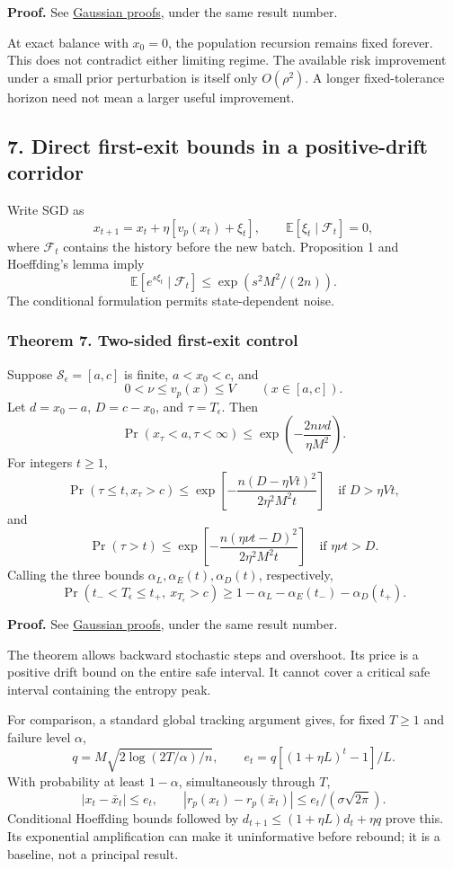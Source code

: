 \textbf{Proof.} See \href{gaussian_proofs.md}{Gaussian proofs}, under
the same result number.

At exact balance with \(x_0=0\), the population recursion remains fixed
forever. This does not contradict either limiting regime. The available
risk improvement under a small prior perturbation is itself only
\(O(\rho^2)\). A longer fixed-tolerance horizon need not mean a larger
useful improvement.

\subsection{7. Direct first-exit bounds in a positive-drift
corridor}\label{draft-direct-first-exit-bounds-in-a-positive-drift-corridor}

Write SGD as \[
x_{t+1}=x_t+\eta[v_p(x_t)+\xi_t],\qquad
\mathbb E[\xi_t\mid\mathcal F_t]=0,
\] where \(\mathcal F_t\) contains the history before the new batch.
Proposition 1 and Hoeffding's lemma imply \[
\mathbb E[e^{s\xi_t}\mid\mathcal F_t]
\le\exp(s^2M^2/(2n)).
\] The conditional formulation permits state-dependent noise.

\subsubsection{Theorem 7. Two-sided first-exit
control}\label{draft-theorem-7.-two-sided-first-exit-control}

Suppose \(\mathcal S_\epsilon=[a,c]\) is finite, \(a<x_0<c\), and \[
0<\nu\le v_p(x)\le V\qquad(x\in[a,c]).
\] Let \(d=x_0-a\), \(D=c-x_0\), and \(\tau=T_\epsilon\). Then \[
\Pr(x_\tau<a,\tau<\infty)\le
\exp\left(-\frac{2n\nu d}{\eta M^2}\right).
\] For integers \(t\ge1\), \[
\Pr(\tau\le t,x_\tau>c)
\le\exp\left[-\frac{n(D-\eta Vt)^2}{2\eta^2M^2t}\right]
\quad\text{if }D>\eta Vt,
\] and \[
\Pr(\tau>t)
\le\exp\left[-\frac{n(\eta\nu t-D)^2}{2\eta^2M^2t}\right]
\quad\text{if }\eta\nu t>D.
\] Calling the three bounds \(\alpha_L,\alpha_E(t),\alpha_D(t)\),
respectively, \[
\Pr(t_-<T_\epsilon\le t_+,\ x_{T_\epsilon}>c)
\ge1-\alpha_L-\alpha_E(t_-)-\alpha_D(t_+).
\]

\textbf{Proof.} See \href{gaussian_proofs.md}{Gaussian proofs}, under
the same result number.

The theorem allows backward stochastic steps and overshoot. Its price is
a positive drift bound on the entire safe interval. It cannot cover a
critical safe interval containing the entropy peak.

For comparison, a standard global tracking argument gives, for fixed
\(T\ge1\) and failure level \(\alpha\), \[
q=M\sqrt{2\log(2T/\alpha)/n},\qquad
e_t=q[(1+\eta L)^t-1]/L.
\] With probability at least \(1-\alpha\), simultaneously through \(T\),
\[
|x_t-\bar x_t|\le e_t,\qquad
|r_p(x_t)-r_p(\bar x_t)|\le e_t/(\sigma\sqrt{2\pi}).
\] Conditional Hoeffding bounds followed by
\(d_{t+1}\le(1+\eta L)d_t+\eta q\) prove this. Its exponential
amplification can make it uninformative before rebound; it is a
baseline, not a principal result.

